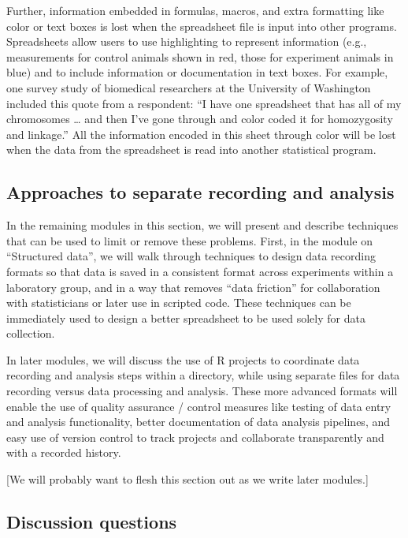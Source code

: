\documentclass[]{tufte-book}
\begin{document}
Further, information embedded in formulas, macros, and extra formatting like
color or text boxes is lost when the spreadsheet file is input into other
programs. Spreadsheets allow users to use highlighting to represent information
(e.g., measurements for control animals shown in red, those for experiment
animals in blue) and to include information or documentation in text boxes. For
example, one survey study of biomedical researchers at the University of
Washington included this quote from a respondent: ``I have one spreadsheet that
has all of my chromosomes \ldots{} and then I've gone through and color coded it for
homozygosity and linkage.'' \citep{anderson2007issues} All the information encoded in
this sheet through color will be lost when the data from the spreadsheet is read
into another statistical program.

\hypertarget{approaches-to-separate-recording-and-analysis}{%
\subsection{Approaches to separate recording and analysis}\label{approaches-to-separate-recording-and-analysis}}

In the remaining modules in this section, we will present and describe techniques
that can be used to limit or remove these problems. First, in the module on
``Structured data'', we will walk through techniques to design data recording
formats so that data is saved in a consistent format across experiments within
a laboratory group, and in a way that removes ``data friction'' for collaboration
with statisticians or later use in scripted code. These techniques can be immediately
used to design a better spreadsheet to be used solely for data collection.

In later modules, we will discuss the use of R projects to coordinate data
recording and analysis steps within a directory, while using separate files for
data recording versus data processing and analysis. These more advanced formats
will enable the use of quality assurance / control measures like testing of data
entry and analysis functionality, better documentation of data analysis pipelines,
and easy use of version control to track projects and collaborate transparently and
with a recorded history.

{[}We will probably want to flesh this section out as we write later modules.{]}

\hypertarget{discussion-questions}{%
\subsection{Discussion questions}\label{discussion-questions}}
\end{document}
